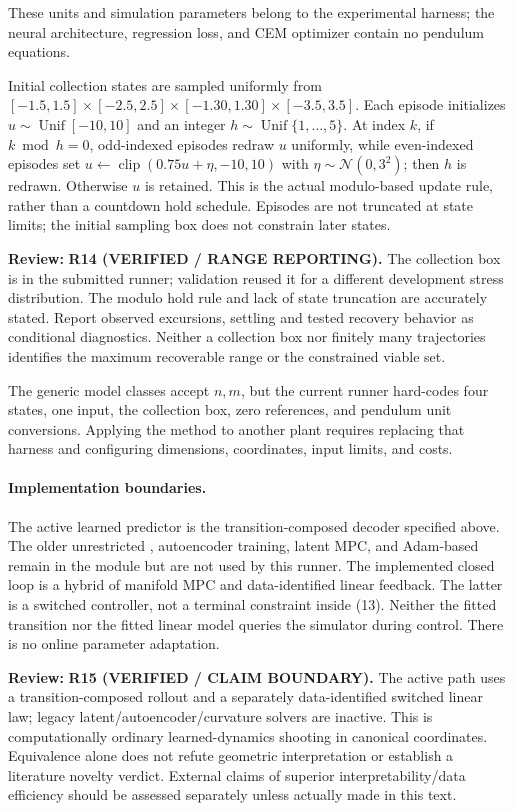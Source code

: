 \documentclass[11pt]{article}
\newcommand{\clip}{\operatorname{clip}}
\newcommand{\review}[1]{\par\noindent\textcolor{red!70!black}{\textbf{Review:} #1}\par}
\newcommand{\code}[1]{\texttt{\detokenize{#1}}}
\begin{document}
These units and simulation parameters belong to the experimental harness; the neural architecture, regression loss, and CEM optimizer contain no pendulum equations.

Initial collection states are sampled uniformly from $[-1.5,1.5]\times[-2.5,2.5]\times[-1.30,1.30]\times[-3.5,3.5]$. Each episode initializes $u\sim\operatorname{Unif}[-10,10]$ and an integer $h\sim\operatorname{Unif}\{1,\ldots,5\}$. At index $k$, if $k\bmod h=0$, odd-indexed episodes redraw $u$ uniformly, while even-indexed episodes set $u\leftarrow\clip(0.75u+\eta,-10,10)$ with $\eta\sim\mathcal N(0,3^2)$; then $h$ is redrawn. Otherwise $u$ is retained. This is the actual modulo-based update rule, rather than a countdown hold schedule. Episodes are not truncated at state limits; the initial sampling box does not constrain later states.
\review{\textbf{R14 (VERIFIED / RANGE REPORTING).} The collection box is in the submitted runner; validation reused it for a different development stress distribution. The modulo hold rule and lack of state truncation are accurately stated. Report observed excursions, settling and tested recovery behavior as conditional diagnostics. Neither a collection box nor finitely many trajectories identifies the maximum recoverable range or the constrained viable set.}


The generic model classes accept $n,m$, but the current runner hard-codes four states, one input, the collection box, zero references, and pendulum unit conversions. Applying the method to another plant requires replacing that harness and configuring dimensions, coordinates, input limits, and costs.

\paragraph{Implementation boundaries.}
The active learned predictor is the transition-composed decoder specified above. The older unrestricted \code{BehaviorDecoder}, autoencoder training, latent MPC, and Adam-based \code{DataDrivenMPCSolver} remain in the module but are not used by this runner. The implemented closed loop is a hybrid of manifold MPC and data-identified linear feedback. The latter is a switched controller, not a terminal constraint inside (13). Neither the fitted transition nor the fitted linear model queries the simulator during control. There is no online parameter adaptation.
\review{\textbf{R15 (VERIFIED / CLAIM BOUNDARY).} The active path uses a transition-composed rollout and a separately data-identified switched linear law; legacy latent/autoencoder/curvature solvers are inactive. This is computationally ordinary learned-dynamics shooting in canonical coordinates. Equivalence alone does not refute geometric interpretation or establish a literature novelty verdict. External claims of superior interpretability/data efficiency should be assessed separately unless actually made in this text.}
\end{document}
